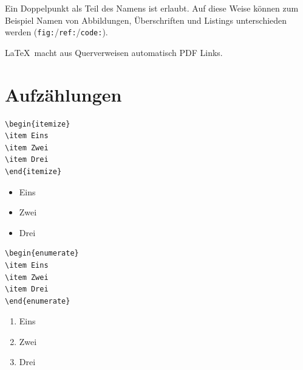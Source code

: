 Ein Doppelpunkt als Teil des Namens ist erlaubt. Auf diese Weise können zum Beispiel Namen von Abbildungen, Überschriften und Listings unterschieden werden (\mbox{\lstinline{fig:}/\lstinline{ref:}/\lstinline{code:}}).

\LaTeX\ macht aus Querverweisen automatisch PDF Links.


\section{Aufzählungen}

\begin{minipage}[c]{0.3\linewidth}
\begin{Verbatim}[frame=single]
\begin{itemize}
\item Eins
\item Zwei
\item Drei
\end{itemize}
\end{Verbatim}
\end{minipage}
\begin{minipage}[c]{0.5\linewidth}
\begin{itemize}
\item Eins
\item Zwei
\item Drei
\end{itemize}
\end{minipage}

\noindent
\begin{minipage}[c]{0.3\linewidth}
\begin{Verbatim}[frame=single]
\begin{enumerate}
\item Eins
\item Zwei
\item Drei
\end{enumerate}
\end{Verbatim}
\end{minipage}
\begin{minipage}[c]{0.5\linewidth}
\begin{enumerate}
\item Eins
\item Zwei
\item Drei
\end{enumerate}
\end{minipage}

